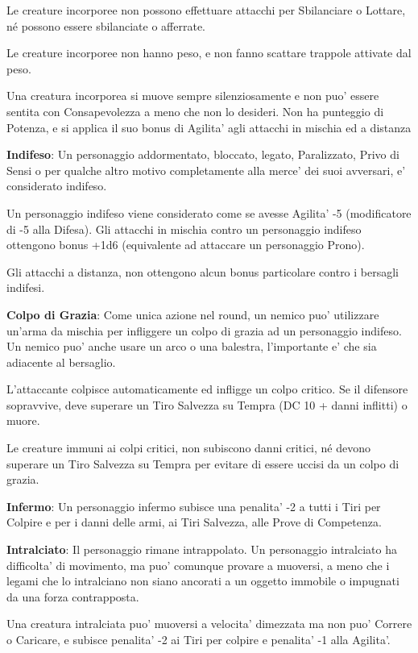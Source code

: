 \documentclass[a4paper,11pt,twoside,openany]{book}
\begin{document}
{		Le creature incorporee non possono effettuare attacchi per Sbilanciare o Lottare, né possono essere sbilanciate o afferrate.
		
		Le creature incorporee non hanno peso, e non fanno scattare trappole attivate dal peso.
		
		Una creatura incorporea si muove sempre silenziosamente e non puo' essere sentita con Consapevolezza a meno che non lo desideri. Non ha punteggio di Potenza, e si applica il suo bonus di Agilita' agli attacchi in mischia ed a distanza
		
		\textbf{Indifeso}: Un personaggio addormentato, bloccato, legato, Paralizzato, Privo di Sensi o per qualche altro motivo completamente alla merce' dei suoi avversari, e' considerato indifeso.
		
		Un personaggio indifeso viene considerato come se avesse Agilita' -5 (modificatore di -5 alla Difesa). Gli attacchi in mischia contro un personaggio indifeso ottengono bonus +1d6 (equivalente ad attaccare un personaggio Prono).
		
		Gli attacchi a distanza, non ottengono alcun bonus particolare contro i bersagli indifesi.
		
		\textbf{Colpo di Grazia}: Come unica azione nel round, un nemico puo' utilizzare un'arma da mischia per infliggere un colpo di grazia ad un personaggio indifeso. Un nemico puo' anche usare un arco o una balestra, l'importante e' che sia adiacente al bersaglio.
		
		L'attaccante colpisce automaticamente ed infligge un colpo critico. Se il difensore sopravvive, deve superare un Tiro Salvezza su Tempra (DC 10 + danni inflitti) o muore.
		
		Le creature immuni ai colpi critici, non subiscono danni critici, né devono superare un Tiro Salvezza su Tempra per evitare di essere uccisi da un colpo di grazia.
		
		\textbf{Infermo}: Un personaggio infermo subisce una penalita' -2 a tutti i Tiri per Colpire e per i danni delle armi, ai Tiri Salvezza, alle Prove di Competenza.
		
		\textbf{Intralciato}: Il personaggio rimane intrappolato. Un personaggio intralciato ha difficolta' di movimento, ma puo' comunque provare a muoversi, a meno che i legami che lo intralciano non siano ancorati a un oggetto immobile o impugnati da una forza contrapposta.
		
		Una creatura intralciata puo' muoversi a velocita' dimezzata ma non puo' Correre o Caricare, e subisce penalita' -2 ai Tiri per colpire e penalita' -1 alla Agilita'. 
		
}
\end{document}
